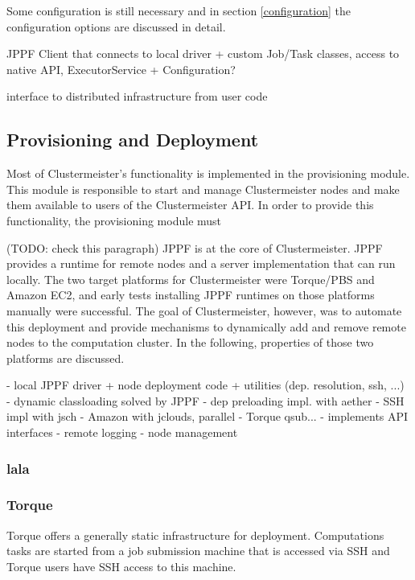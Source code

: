 \documentclass[12pt]{article}
\begin{document}
Some configuration is still necessary and in section \ref{configuration} the configuration options are discussed in detail.

JPPF Client that connects to local driver
+ custom Job/Task classes, access to native API, ExecutorService
+ Configuration?

interface to distributed infrastructure from user code

\subsection{Provisioning and Deployment}
Most of Clustermeister's functionality is implemented in the provisioning module. This module is responsible to start and manage Clustermeister nodes and make them available to users of the Clustermeister API. In order to provide this functionality, the provisioning module must   

(TODO: check this paragraph)
JPPF is at the core of Clustermeister. JPPF provides a runtime for remote nodes and a server implementation that can run locally. The two target platforms for Clustermeister were Torque/PBS and Amazon EC2, and early tests installing JPPF runtimes on those platforms manually were successful. The goal of Clustermeister, however, was to automate this deployment and provide mechanisms to dynamically add and remove remote nodes to the computation cluster. In the following, properties of those two platforms are discussed.

- local JPPF driver + node deployment code + utilities (dep. resolution, ssh, ...)
- dynamic classloading solved by JPPF
- dep preloading impl. with aether
- SSH impl with jsch
- Amazon with jclouds, parallel
- Torque qsub...
- implements API interfaces
- remote logging
- node management

\subsubsection{lala}

\subsubsection{Torque}

\label{implementation-torque}

Torque offers a generally static infrastructure for deployment. Computations tasks are started from a job submission machine that is accessed via SSH and Torque users have SSH access to this machine.
\end{document}
